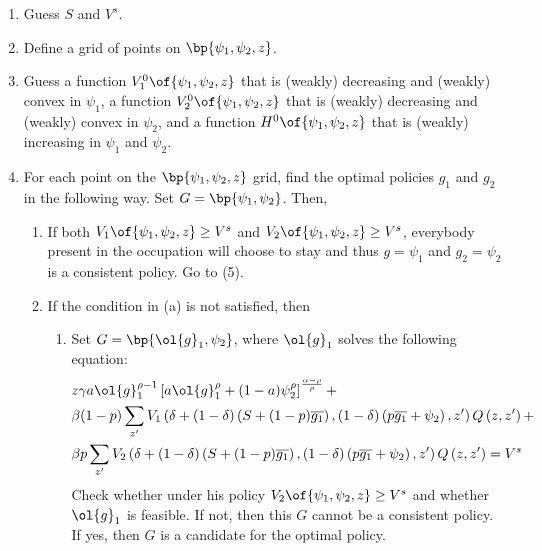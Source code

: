 \documentclass[12pt]{article}
\theoremstyle{definition}
\begin{document}
\begin{enumerate}[topsep=0pt, leftmargin=20pt, itemsep=0pt, label=(\arabic*)]
\setlength{\parskip}{10pt} 
\item Guess $S$ and $V^s$.
\item Define a grid of points on $\bp{\psi_1, \psi_2, z}$.
\item Guess a function $V_1^0\of{\psi_1, \psi_2, z}$ that is (weakly) decreasing and (weakly) convex in $\psi_1$, a function $V_2^0\of{\psi_1, \psi_2, z}$ that is (weakly) decreasing and (weakly) convex in $\psi_2$, and a function $H^0\of{\psi_1, \psi_2, z}$ that is (weakly) increasing in $\psi_1$ and $\psi_2$.
\item For each point on the $\bp{\psi_1, \psi_2, z}$ grid, find the optimal policies $g_1$ and $g_2$ in the following way. Set $G = \bp{\psi_1, \psi_2}$. Then, 
\begin{enumerate}[topsep=0pt, leftmargin=25pt, itemsep=0pt, label=(\alph*)]
	\setlength{\parskip}{10pt} 
	\item If both $V_1\of{\psi_1, \psi_2, z} \geq V^s$ and $V_2\of{\psi_1, \psi_2, z} \geq V^s$, everybody present in the occupation will choose to stay and thus $g = \psi_1$ and $g_2 = \psi_2$ is a consistent policy. Go to (5).
	\item If the condition in (a) is not satisfied, then 
    \begin{enumerate}[topsep=0pt, leftmargin=30pt, itemsep=0pt, label=(\roman*)]
        \setlength{\parskip}{10pt} 
        \item Set $G = \bp{\ol{g}_1, \psi_2}$, where $\ol{g}_1$ solves the following equation:
        \begin{equation}
            \notag 
            \begin{aligned}
            & z \gamma a \ol{g}_1^{\rho-1}\left[a \ol{g}_1^\rho+(1-a) \psi_2^\rho\right]^{\frac{\alpha-\rho}{\rho}}+ \\
            & \beta(1-p) \sum_{z^{\prime}} V_1\left(\delta+(1-\delta)\left(S+(1-p) \overline{g_1}\right),(1-\delta)\left(p \overline{g_1}+\psi_2\right), z^{\prime}\right) Q\left(z, z^{\prime}\right)+ \\
            & \beta p \sum_{z^{\prime}} V_2\left(\delta+(1-\delta)\left(S+(1-p) \overline{g_1}\right),(1-\delta)\left(p \overline{g_1}+\psi_2\right), z^{\prime}\right) Q\left(z, z^{\prime}\right)=V^s
            \end{aligned}
        \end{equation}
        Check whether under his policy $V_2\of{\psi_1, \psi_2, z} \geq V^s$ and whether $\ol{g}_1$ is feasible. If not, then this $G$ cannot be a consistent policy. If yes, then $G$ is a candidate for the optimal policy. 

\end{enumerate}
\end{enumerate}
\end{enumerate}
\end{document}
